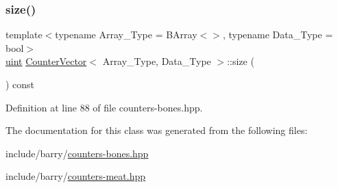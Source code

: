 \mbox{\label{class_counter_vector_affee3825ee1b1ce01b926f443c67f585}} 
\subsubsection{\texorpdfstring{size()}{size()}}
{\footnotesize\ttfamily template$<$typename Array\+\_\+\+Type = B\+Array$<$$>$, typename Data\+\_\+\+Type = bool$>$ \\
\hyperlink{typedefs_8hpp_a91ad9478d81a7aaf2593e8d9c3d06a14}{uint} \hyperlink{class_counter_vector}{Counter\+Vector}$<$ Array\+\_\+\+Type, Data\+\_\+\+Type $>$\+::size (\begin{DoxyParamCaption}{ }\end{DoxyParamCaption}) const\hspace{0.3cm}{\ttfamily [inline]}}



Definition at line 88 of file counters-\/bones.\+hpp.



The documentation for this class was generated from the following files\+:\begin{DoxyCompactItemize}
\item 
include/barry/\hyperlink{counters-bones_8hpp}{counters-\/bones.\+hpp}\item 
include/barry/\hyperlink{counters-meat_8hpp}{counters-\/meat.\+hpp}\end{DoxyCompactItemize}
